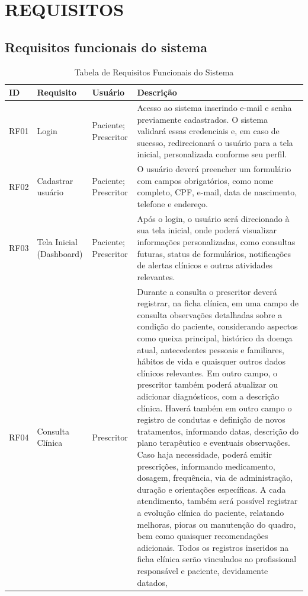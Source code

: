 \href{}{}\documentclass[12pt,portuguese,oneside]{article}
\begin{document}
\section{REQUISITOS}

\subsection{Requisitos funcionais do sistema}

\begin{table}[H]
\centering
\caption{Tabela de Requisitos Funcionais do Sistema}
\begin{tabularx}{\textwidth}{|>{\raggedright\arraybackslash}p{1cm}|>{\raggedright\arraybackslash}p{2.5cm}|>{\raggedright\arraybackslash}p{2cm}|>{\raggedright\arraybackslash}X|}
\hline
\rowcolor{gray!20}
\textbf{ID} & \textbf{Requisito} & \textbf{Usuário} & \textbf{Descrição}\\
\hline
RF01 & Login & Paciente; Prescritor & Acesso ao sistema inserindo e-mail e senha previamente cadastrados. O sistema validará essas credenciais e, em caso de sucesso, redirecionará o usuário para a tela inicial, personalizada conforme seu perfil.\\
\hline
RF02 & Cadastrar usuário & Paciente; Prescritor & O usuário deverá preencher um formulário com campos obrigatórios, como nome completo, CPF, e-mail, data de nascimento, telefone e endereço.\\
\hline
RF03 & Tela Inicial (Dashboard) & Paciente; Prescritor & Após o login, o usuário será direcionado à sua tela inicial, onde poderá visualizar informações personalizadas, como consultas futuras, status de formulários, notificações de alertas clínicos e outras atividades relevantes.\\
\hline
RF04 & Consulta Clínica & Prescritor & Durante a consulta o prescritor deverá registrar, na ficha clínica, em uma campo de consulta observações detalhadas sobre a condição do paciente, considerando aspectos como queixa principal, histórico da doença atual, antecedentes pessoais e familiares, hábitos de vida e quaisquer outros dados clínicos relevantes. Em outro campo, o prescritor também poderá atualizar ou adicionar diagnósticos, com a descrição clínica. Haverá também em outro campo o registro de condutas e definição de novos tratamentos, informando datas, descrição do plano terapêutico e eventuais observações. Caso haja necessidade, poderá emitir prescrições, informando medicamento, dosagem, frequência, via de administração, duração e orientações específicas. A cada atendimento, também será possível registrar a evolução clínica do paciente, relatando melhoras, pioras ou manutenção do quadro, bem como quaisquer recomendações adicionais. Todos os registros inseridos na ficha clínica serão vinculados ao profissional responsável e paciente, devidamente datados, \\

\end{tabularx}
\end{table}
\end{document}
